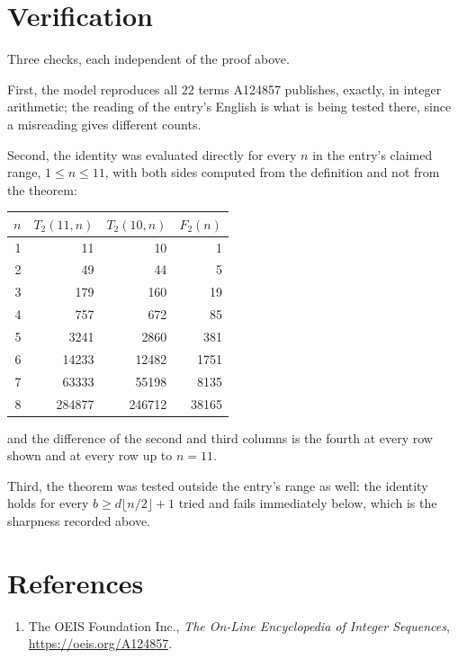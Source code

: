 \documentclass[11pt,a4paper]{article}
\theoremstyle{plain}
\theoremstyle{definition}
\begin{document}
\section{Verification}

Three checks, each independent of the proof above.

First, the model reproduces all $22$ terms A124857 publishes, exactly, in integer
arithmetic; the reading of the entry's English is what is being tested there, since a
misreading gives different counts.

Second, the identity was evaluated directly for every $n$ in the entry's claimed range,
$1\le n\le11$, with both sides computed from the definition and not from the theorem:

\begin{center}
\begin{tabular}{rrrr}
$n$ & $T_{2}(11,n)$ & $T_{2}(10,n)$ & $F_{2}(n)$ \\ \hline
1 & 11 & 10 & 1 \\
2 & 49 & 44 & 5 \\
3 & 179 & 160 & 19 \\
4 & 757 & 672 & 85 \\
5 & 3241 & 2860 & 381 \\
6 & 14233 & 12482 & 1751 \\
7 & 63333 & 55198 & 8135 \\
8 & 284877 & 246712 & 38165 \\
\end{tabular}
\end{center}

\noindent and the difference of the second and third columns is the fourth at every row shown
and at every row up to $n=11$.

Third, the theorem was tested outside the entry's range as well: the identity holds for every
$b\ge d\lfloor n/2\rfloor+1$ tried and fails immediately below, which is the sharpness recorded
above.

\section*{References}
\begin{enumerate}
\item The OEIS Foundation Inc., \emph{The On-Line Encyclopedia of Integer Sequences},
\url{https://oeis.org/A124857}.
\end{enumerate}
\end{document}
